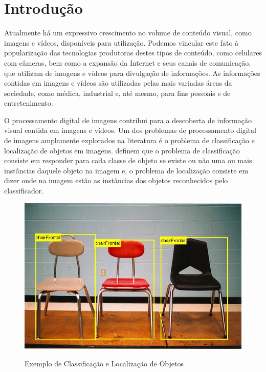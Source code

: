 \chapter{Introdução}
\label{cap:1}

\vspace{-1.9cm}

Atualmente há um expressivo crescimento no volume de conteúdo visual, como imagens e vídeos, disponíveis para utilização. Podemos vincular este fato à popularização das tecnologias produtoras destes tipos de conteúdo, como celulares com câmeras, bem como a expansão da Internet e seus canais de comunicação, que utilizam de imagens e vídeos para divulgação de informações. As informações contidas em imagens e vídeos são utilizadas pelas mais variadas áreas da sociedade, como médica, industrial e, até mesmo, para fins pessoais e de entretenimento.

O processamento digital de imagens contribui para a descoberta de informação visual contida em imagens e vídeos. Um dos problemas de processamento digital de imagens amplamente explorados na literatura é o problema de classificação e localização de objetos em imagens.  definem que o problema de classificação consiste em responder para cada classe de objeto se existe ou não uma ou mais instâncias daquele objeto na imagem e, o problema de localização consiste em dizer onde na imagem estão as instâncias dos objetos reconhecidos pelo classificador.

  \begin{figure}[H]
  \setlength{\abovecaptionskip}{0pt}
  \setlength{\belowcaptionskip}{0pt}
  \caption[Exemplo de Classificação e Localização]{Exemplo de Classificação e Localização de Objetos}
  \centering
  \includegraphics[width=.9\textwidth]{imagem/0x_classdetec.jpg}
  \captionsetup{justification=centering}
  \label{fig:exemploclassdet}
  \end{figure}

